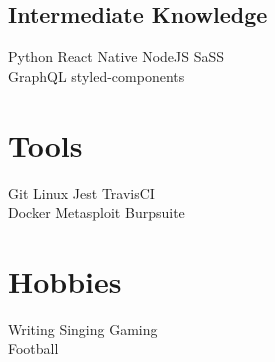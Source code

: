 \documentclass[]{deedy-resume-openfont}
\begin{document}
\begin{minipage}[t]{0.33\textwidth}
\subsection{Intermediate Knowledge}
Python \textbullet{} React Native \textbullet{} NodeJS \textbullet{} SaSS\\
GraphQL \textbullet{} styled-components


\section{Tools}
Git \textbullet{} Linux \textbullet{}  Jest \textbullet{} TravisCI \\
Docker \textbullet{}  Metasploit \textbullet{} Burpsuite 


\section{Hobbies}
Writing \textbullet{} Singing \textbullet{} Gaming \\
Football





%
%

\end{minipage} 
\hfill
\end{document}
